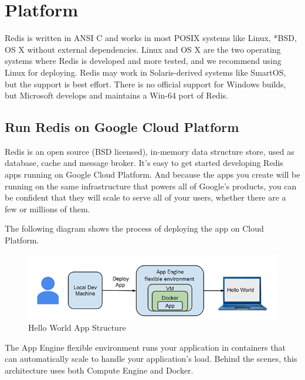 \chapter{Platform}
Redis is written in ANSI C and works in most POSIX systems like Linux, *BSD, OS X without external dependencies. Linux and OS X are the two operating systems where Redis is developed and more tested, and we recommend using Linux for deploying. Redis may work in Solaris-derived systems like SmartOS, but the support is best effort. There is no official support for Windows builds, but Microsoft develops and maintains a Win-64 port of Redis.

\section{Run Redis on Google Cloud Platform}
Redis is an open source (BSD licensed), in-memory data structure store, used as database, cache and message broker.
It's easy to get started developing Redis apps running on Google Cloud Platform. And because the apps you create will be running on the same infrastructure that powers all of Google's products, you can be confident that they will scale to serve all of your users, whether there are a few or millions of them.

The following diagram shows the process of deploying the app on Cloud Platform.

\begin{figure}[htb!]
	\centerline{\includegraphics{resources/hello-world-app-structure.png}}
	\caption{Hello World App Structure}
	\label{hello-world-app-structure}
\end{figure}
The App Engine flexible environment runs your application in containers that can automatically scale to handle your application's load. Behind the scenes, this architecture uses both Compute Engine and Docker.